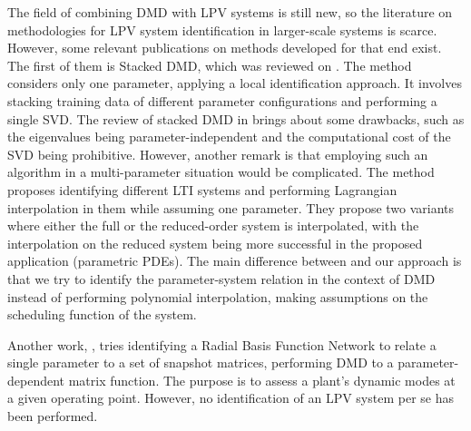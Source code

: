 The field of combining DMD with LPV systems is still new, so the literature on methodologies for LPV system identification in larger-scale systems is scarce. However, some relevant publications on methods developed for that end exist.
%
The first of them is Stacked DMD, which was reviewed on \cite{Huhn2023}.
%
The method considers only one parameter, applying a local identification approach.
%
It involves stacking training data of different parameter configurations and performing a single SVD.
%
The review of stacked DMD in \cite{Huhn2023} brings about some drawbacks, such as the eigenvalues being parameter-independent and the computational cost of the SVD being prohibitive.
%
However, another remark is that employing such an algorithm in a multi-parameter situation would be complicated.
%
The method \cite{Huhn2023} proposes identifying different LTI systems and performing Lagrangian interpolation in them while assuming one parameter.
%
They propose two variants where either the full or the reduced-order system is interpolated, with the interpolation on the reduced system being more successful in the proposed application (parametric PDEs).
%
The main difference between \cite{Huhn2023} and our approach is that we try to identify the parameter-system relation in the context of DMD instead of performing polynomial interpolation, making assumptions on the scheduling function of the system.


Another work, \cite{Sun2023}, tries identifying a Radial Basis Function Network to relate a single parameter to a set of snapshot matrices, performing DMD to a parameter-dependent matrix function.
%
The purpose is to assess a plant's dynamic modes at a given operating point. However, no identification of an LPV system per se has been performed.


